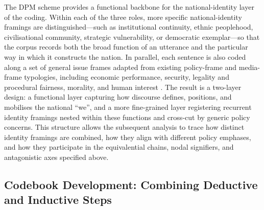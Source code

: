 \documentclass[man,12pt]{apa7}
\begin{document}
The DPM scheme provides a functional backbone for the national-identity layer of the coding. 
Within each of the three roles, more specific national-identity framings are distinguished—such as institutional continuity, ethnic peoplehood, civilisational community, strategic vulnerability, or democratic exemplar—so that the corpus records both the broad function of an utterance and the particular way in which it constructs the nation. 
In parallel, each sentence is also coded along a set of general issue frames adapted from existing policy-frame and media-frame typologies, including economic performance, security, legality and procedural fairness, morality, and human interest \parencite{matthes2008,boydstun2014}. 
The result is a two-layer design: a functional layer capturing how discourse defines, positions, and mobilises the national ``we'', and a more fine-grained layer registering recurrent identity framings nested within these functions and cross-cut by generic policy concerns. 
This structure allows the subsequent analysis to trace how distinct identity framings are combined, how they align with different policy emphases, and how they participate in the equivalential chains, nodal signifiers, and antagonistic axes specified above.\\%
\subsection{Codebook Development: Combining Deductive and Inductive Steps}   
\end{document}
